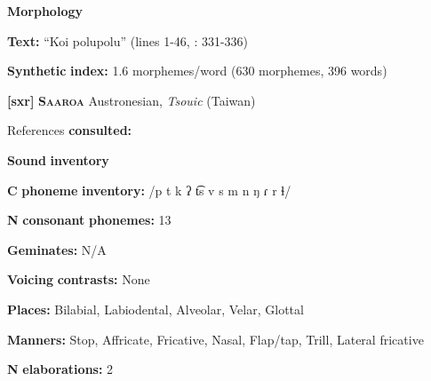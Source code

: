 \begin{styleBody}
\textbf{Morphology}
\end{styleBody}

\begin{styleBody}
\textbf{Text:} “Koi polupolu” (lines 1-46, \citealt{Wegener2008}: 331-336)
\end{styleBody}

\begin{styleBody}
\textbf{Synthetic} \textbf{index:} 1.6 morphemes/word (630 morphemes, 396 words)
\end{styleBody}

\begin{styleBody}
\textbf{[sxr]}   \textbf{\textsc{Saaroa}  }  Austronesian, \textit{Tsouic} (Taiwan)
\end{styleBody}

\begin{styleBody}
References \textbf{consulted:} \citet{Pan2012}
\end{styleBody}

\begin{styleBody}
\textbf{Sound} \textbf{inventory}
\end{styleBody}

\begin{styleBody}
\textbf{C} \textbf{phoneme} \textbf{inventory:} /p t k ʔ t͡s v s m n ŋ ɾ r ɬ/
\end{styleBody}

\begin{styleBody}
\textbf{N} \textbf{consonant} \textbf{phonemes:} 13
\end{styleBody}

\begin{styleBody}
\textbf{Geminates:} N/A
\end{styleBody}

\begin{styleBody}
\textbf{Voicing} \textbf{contrasts:} None
\end{styleBody}

\begin{styleBody}
\textbf{Places:} Bilabial, Labiodental, Alveolar, Velar, Glottal
\end{styleBody}

\begin{styleBody}
\textbf{Manners:} Stop, Affricate, Fricative, Nasal, Flap/tap, Trill, Lateral fricative
\end{styleBody}

\begin{styleBody}
\textbf{N} \textbf{elaborations:} 2
\end{styleBody}


